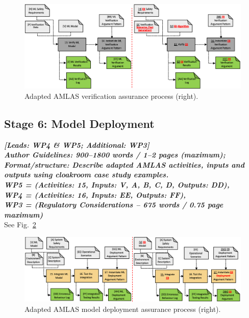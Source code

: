 \documentclass[lettersize,journal]{IEEEtran}
\begin{document}

\begin{figure}
	\centering
	\includegraphics[width=1.0\textwidth]{figures/amlas-a-stage5.png}
	\caption{Adapted AMLAS verification assurance process (right).}
	\label{amlas-a-stage5}
\end{figure}


\subsection{Stage 6: Model Deployment} \label{framework-stage6}
\noindent \textbf{\textit{[Leads:  WP4 \& WP5; Additional: WP3]}}\\ 
\noindent\textbf{\textit{Author Guidelines: 900–1800 words / 1–2 pages (maximum); \\Format/structure: Describe adapted AMLAS activities, inputs and outputs using cloakroom case study examples.\\ 
\noindent WP5 = (Activities: 15, Inputs: V, A, B, C, D, Outputs: DD), \\
\noindent WP4 = (Activities: 16, Inputs: EE, Outputs: FF), \\
\noindent WP3 = (Regulatory Considerations – 675 words / 0.75 page maximum)}}\\
See Fig.~\ref{amlas-a-stage6}
\begin{figure}
	\centering
	\includegraphics[width=1.0\textwidth]{figures/amlas-a-stage6.png}
	\caption{Adapted AMLAS model deployment assurance process (right).}
	\label{amlas-a-stage6}
\end{figure}
\end{document}
